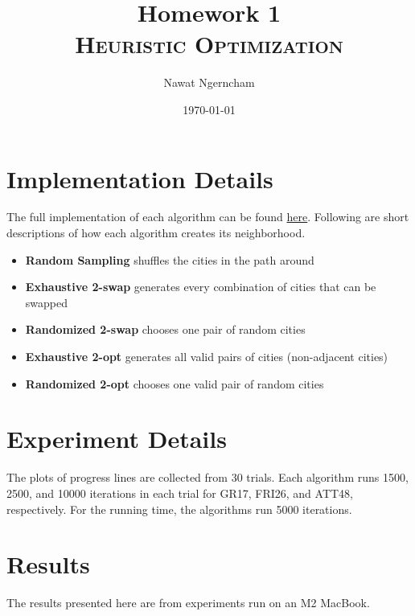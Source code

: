 \documentclass{article}
\title{\Huge{Homework 1}
	\\
	\Large\scshape{Heuristic Optimization}}
\author{Nawat Ngerncham}
\date{\today}
\begin{document}
\maketitle
	
\section{Implementation Details}

The full implementation of each algorithm can be found \hyperlink{https://github.com/nngerncham/ma395_heuristic/tree/main/homework/hw1/tsp_algorithms}{here}. Following are short descriptions of how each algorithm creates its neighborhood.

\begin{itemize}
    \item \textbf{Random Sampling} shuffles the cities in the path around
    \item \textbf{Exhaustive 2-swap} generates every combination of cities that can be swapped
    \item \textbf{Randomized 2-swap} chooses one pair of random cities
    \item \textbf{Exhaustive 2-opt} generates all valid pairs of cities (non-adjacent cities)
    \item \textbf{Randomized 2-opt} chooses one valid pair of random cities
\end{itemize}

\section{Experiment Details}

The plots of progress lines are collected from 30 trials. Each algorithm runs 1500, 2500, and 10000 iterations in each trial for GR17, FRI26, and ATT48, respectively. For the running time, the algorithms run 5000 iterations.

\section{Results}

The results presented here are from experiments run on an M2 MacBook.
\end{document}
